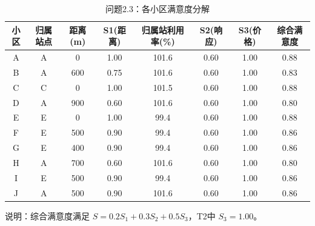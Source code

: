 \begin{table}[htbp]
\centering
\caption{问题2.3：各小区满意度分解}
\begin{tabular}{|c|c|c|c|c|c|c|c|}
\hline
小区 & 归属站点 & 距离(m) & S1(距离) & 归属站利用率(\%) & S2(响应) & S3(价格) & 综合满意度 \\
\hline
A & A & 0 & 1.00 & 101.6 & 0.60 & 1.00 & 0.88 \\
B & A & 600 & 0.75 & 101.6 & 0.60 & 1.00 & 0.83 \\
C & C & 0 & 1.00 & 101.5 & 0.60 & 1.00 & 0.88 \\
D & A & 900 & 0.60 & 101.6 & 0.60 & 1.00 & 0.80 \\
E & E & 0 & 1.00 & 99.4 & 0.60 & 1.00 & 0.88 \\
F & E & 500 & 0.90 & 99.4 & 0.60 & 1.00 & 0.86 \\
G & E & 400 & 0.90 & 99.4 & 0.60 & 1.00 & 0.86 \\
H & A & 700 & 0.60 & 101.6 & 0.60 & 1.00 & 0.80 \\
I & E & 500 & 0.90 & 99.4 & 0.60 & 1.00 & 0.86 \\
J & A & 500 & 0.90 & 101.6 & 0.60 & 1.00 & 0.86 \\
\hline
\end{tabular}
\vspace{0.2cm}
说明：综合满意度满足 $S=0.2S_1+0.3S_2+0.5S_3$，T2中 $S_3=1.00$。
\end{table}

